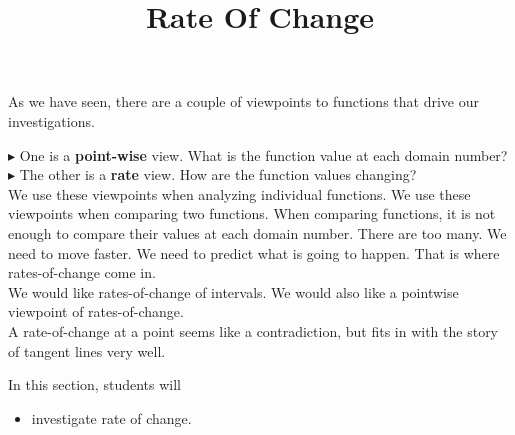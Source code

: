 \documentclass{ximera}
\title{Rate Of Change}
\begin{document}
\begin{abstract}
\end{abstract}
\maketitle







As we have seen, there are a couple of viewpoints to functions that drive our investigations.

$\blacktriangleright$ One is a \textbf{point-wise} view.  What is the function value at each domain number? \\


$\blacktriangleright$ The other is a \textbf{rate} view.  How are the function values changing? \\



We use these viewpoints when analyzing individual functions.  We use these viewpoints when comparing two functions. When comparing functions, it is not enough to compare their values at each domain number.  There are too many.  We need to move faster.  We need to predict what is going to happen. That is where rates-of-change come in. \\




We would like rates-of-change of intervals.  We would also like a pointwise viewpoint of rates-of-change. \\



A rate-of-change at a point seems like a contradiction, but fits in with the story of tangent lines very well.
















\begin{sectionOutcomes}
In this section, students will 

\begin{itemize}
\item investigate rate of change.

\end{itemize}
\end{sectionOutcomes}
\end{document}
